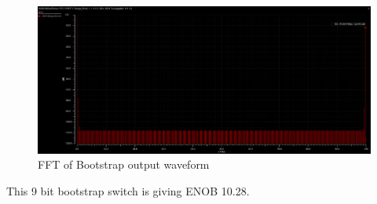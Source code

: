 \documentclass[a4paper,12pt]{article}
\begin{document}
\begin{figure}[H]
    \centering
    \includegraphics[max width = \textwidth]{Images/bootstrap_out_fft.png}
    \caption{FFT of Bootstrap output waveform}
    \label{fig:enter-label}
\end{figure}

This 9 bit bootstrap switch is giving ENOB 10.28.
\end{document}
